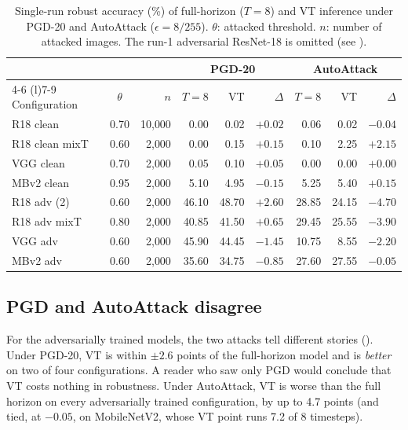 \begin{table}[htbp]
    \centering
    \caption[Single-run robustness of fixed and VT inference]{Single-run robust accuracy (\%) of full-horizon ($T=8$) and VT inference under PGD-20 and AutoAttack ($\epsilon = 8/255$). $\theta$: attacked threshold. $n$: number of attacked images. The run-1 adversarial ResNet-18 is omitted (see ).}
    \label{tab:res-robust}
    \small
    \setlength{\tabcolsep}{4pt}
    \begin{tabular}{@{}l c r r r r r r r@{}}
        \toprule
        & & & \multicolumn{3}{c}{PGD-20} & \multicolumn{3}{c}{AutoAttack} \\
        \cmidrule(lr){4-6} \cmidrule(l){7-9}
        Configuration & $\theta$ & $n$ & $T{=}8$ & VT & $\Delta$ & $T{=}8$ & VT & $\Delta$ \\
        \midrule
        R18 clean       & 0.70 & 10{,}000 & 0.00 & 0.02 & $+0.02$ & 0.06 & 0.02 & $-0.04$ \\
        R18 clean mixT  & 0.60 & 2{,}000  & 0.00 & 0.15 & $+0.15$ & 0.10 & 2.25 & $+2.15$ \\
        VGG clean       & 0.70 & 2{,}000  & 0.05 & 0.10 & $+0.05$ & 0.00 & 0.00 & $+0.00$ \\
        MBv2 clean      & 0.95 & 2{,}000  & 5.10 & 4.95 & $-0.15$ & 5.25 & 5.40 & $+0.15$ \\
        \midrule
        R18 adv (2)     & 0.60 & 2{,}000  & 46.10 & 48.70 & $+2.60$ & 28.85 & 24.15 & $-4.70$ \\
        R18 adv mixT    & 0.80 & 2{,}000  & 40.85 & 41.50 & $+0.65$ & 29.45 & 25.55 & $-3.90$ \\
        VGG adv         & 0.60 & 2{,}000  & 45.90 & 44.45 & $-1.45$ & 10.75 & 8.55  & $-2.20$ \\
        MBv2 adv        & 0.60 & 2{,}000  & 35.60 & 34.75 & $-0.85$ & 27.60 & 27.55 & $-0.05$ \\
        \bottomrule
    \end{tabular}
\end{table}

\subsection{PGD and AutoAttack disagree}

For the adversarially trained models, the two attacks tell different stories (). Under PGD-20, VT is within $\pm 2.6$ points of the full-horizon model and is \emph{better} on two of four configurations. A reader who saw only PGD would conclude that VT costs nothing in robustness. Under AutoAttack, VT is worse than the full horizon on every adversarially trained configuration, by up to 4.7 points (and tied, at $-0.05$, on MobileNetV2, whose VT point runs 7.2 of 8 timesteps).

